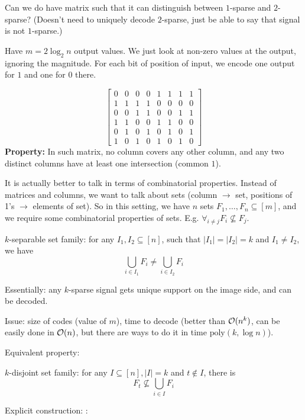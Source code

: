 \documentclass[11pt]{article}
\begin{document}
Can we do have matrix such that it can distinguish between $1$-sparse and $2$-sparse? (Doesn't need to uniquely decode $2$-sparse, just be able to say that signal is not $1$-sparse.)

Have $m = 2 \log_2 n$ output values. We just look at non-zero values at the output, ignoring the magnitude. For each bit of position of input, we encode one output for $1$ and one for $0$ there.

$$\begin{bmatrix} 0 & 0 & 0 & 0 & 1 & 1 & 1 & 1 \\ 1 & 1 & 1 & 1 &  0 & 0 & 0 & 0 \\  0 & 0 & 1 & 1 & 0 & 0 & 1 & 1 \\ 1 & 1 & 0 & 0 & 1 & 1 & 0 & 0  \\ 0 & 1 & 0 & 1 & 0 & 1 & 0 & 1 \\ 1 & 0 & 1 & 0 & 1 & 0 & 1 & 0 \end{bmatrix}
$$
\textbf{Property:} In such matrix, no column covers any other column, and any two distinct columns have at least one intersection (common $1$).


It is actually better to talk in terms of combinatorial properties. Instead of matrices and columns, we want to talk about sets (column $\to$ set, positions of 1's $\to$ elements of set).
So in this setting, we have $n$ sets $F_1,\ldots,F_n \subseteq [m]$, and we require some combinatorial properties of sets. E.g. $\forall_{i\not=j} F_i \not\subseteq F_j$.

\begin{definition}
$k$-separable set family: for any $I_1,I_2 \subseteq [n]$, such that $|I_1| = |I_2| = k$ and $I_1 \not= I_2$, we have
$$ \bigcup_{i \in I_1} F_i \not= \bigcup_{i \in I_2} F_i$$
\end{definition}

Essentially: any $k$-sparse signal gets unique support on the image side, and can be decoded.

Issue: size of codes (value of $m$), time to decode (better than $\mathcal{O}(n^k)$, can be easily done in $\mathcal{O}(n)$, but there are ways to do it in time $\textrm{poly}(k,\log n)$).

Equivalent property: 
\begin{definition}
$k$-disjoint set family:
for any $I \subseteq [n], |I| = k$ and $t \not\in I$, there is 
$$F_t \not\subseteq \bigcup_{i \in I} F_i$$
\end{definition}

Explicit construction: \cite{doi:reed-solomon}:
\end{document}
